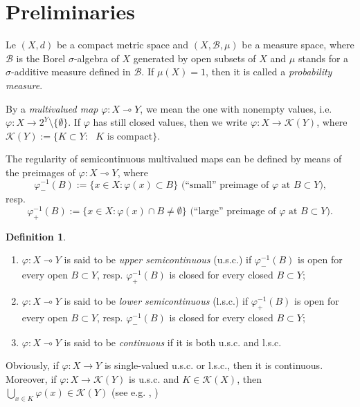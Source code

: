 \documentclass[12pt]{amsart}
\theoremstyle{definition}
\newtheorem{definition}{Definition}
\newcommand{\K}{\mathcal{K}}
\newcommand{\KK}{\mathcal K}
\newcommand{\vp}{\varphi}
\newcommand{\B}{{\mathcal{B}}}
\begin{document}
\section{Preliminaries}\label{sec:2}
Le $(X,d)$ be a compact metric space and $(X,\B,\mu)$ be a measure space, where $\B$ is the Borel $\sigma$-algebra of $X$ generated by open subsets of $X$ and $\mu$ stands for a $\sigma$-additive measure defined in $\B$. If $\mu(X)=1$, then it is called a \emph{probability measure}.

By a \emph{multivalued map} $\vp:X\multimap Y$, we mean the one with nonempty values, i.e. $\vp:X\to 2^{Y}\setminus\{\emptyset\}$. If $\vp$ has still closed values, then we write $\vp:X\to\K(Y)$, where $\K(Y):=\{K\subset Y: \mbox{ $K$ is compact}\}$.

The regularity of semicontinuous multivalued maps can be defined by means of the preimages of $\vp\colon X\multimap Y$, where
\begin{equation*}
\vp^{-1}_-(B):= \{x\in X:\vp(x)\subset B\} \mbox{ (``small'' preimage of $\vp$ at $B\subset Y$),}
\end{equation*}
resp.
\begin{equation*}
\vp^{-1}_+(B):= \{x\in X:\vp(x)\cap B\neq\emptyset\} \mbox{ (``large'' preimage of $\vp$ at $B\subset Y$).}
\end{equation*}

\begin{definition}\label{d:1}
\begin{enumerate}
	\item[(i)] $\vp:X\multimap Y$ is said to be \emph{upper semicontinuous} (u.s.c.) if $\vp^{-1}_-(B)$ is open for every open $B\subset Y$, resp. $\vp^{-1}_+(B)$ is closed for every closed $B\subset Y$;
	\item[(ii)] $\vp:X\multimap Y$ is said to be \emph{lower semicontinuous} (l.s.c.) if $\vp^{-1}_+(B)$ is open for every open $B\subset Y$, resp. $\vp^{-1}_-(B)$ is closed for every closed $B\subset Y$;
	\item[(iii)] $\vp:X\multimap Y$ is said to be \emph{continuous} if it is both u.s.c. and l.s.c.
\end{enumerate}
\end{definition}

Obviously, if $\vp:X\to Y$ is single-valued u.s.c. or l.s.c., then it is continuous. Moreover, if $\vp:X\to\KK(Y)$ is u.s.c. and $K\in\KK(X)$, then $\bigcup_{x\in K} \vp(x)\in\KK(Y)$ (see e.g. \cite[Proposition I.3.20]{AG}, \cite[Corollary 1.2.20]{HP})
\end{document}
